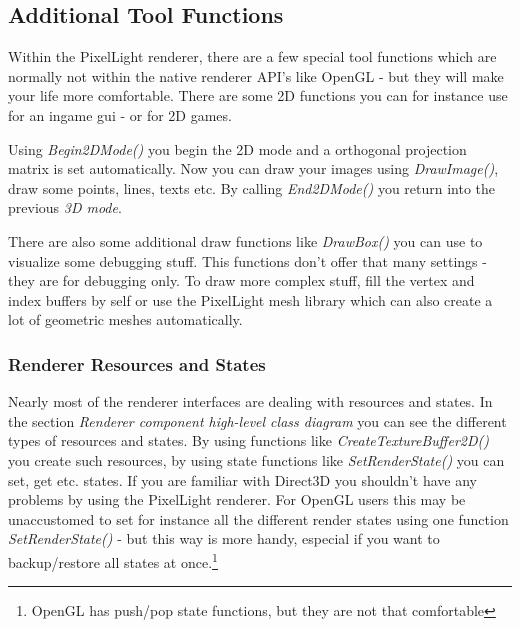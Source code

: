 \subsection{Additional Tool Functions}
Within the PixelLight renderer, there are a few special tool functions which are normally not within the native renderer API's like OpenGL - but they will make your life more comfortable. There are some 2D functions you can for instance use for an ingame gui - or for 2D games.

Using \emph{Begin2DMode()} you begin the 2D mode and a orthogonal projection matrix is set automatically. Now you can draw your images using \emph{DrawImage()}, draw some points, lines, texts etc. By calling \emph{End2DMode()} you return into the previous \emph{3D mode}.

There are also some additional draw functions like \emph{DrawBox()} you can use to visualize some debugging stuff. This functions don't offer that many settings - they are for debugging only. To draw more complex stuff, fill the vertex and index buffers by self or use the PixelLight mesh library which can also create a lot of geometric meshes automatically.



\subsubsection{Renderer Resources and States}
Nearly most of the renderer interfaces are dealing with resources and states. In the section \emph{Renderer component high-level class diagram} you can see the different types of resources and states. By using functions like \emph{CreateTextureBuffer2D()} you create such resources, by using state functions like \emph{SetRenderState()} you can set, get etc. states. If you are familiar with Direct3D you shouldn't have any problems by using the PixelLight renderer. For OpenGL users this may be unaccustomed to set for instance all the different render states using one function \emph{SetRenderState()} - but this way is more handy, especial if you want to backup/restore all states at once.\footnote{OpenGL has push/pop state functions, but they are not that comfortable}



